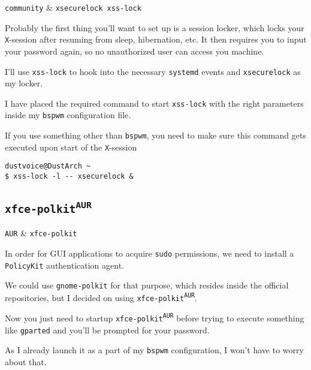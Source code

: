 \documentclass[10pt]{dustdoc}
\begin{document}
\begin{packagetable}
    \texttt{community} & \texttt{xsecurelock xss-lock} \\ 
\end{packagetable}

Probably the first thing you’ll want to set up is a session locker, which locks your \texttt{X}-session after resuming from sleep, hibernation, etc.
It then requires you to input your password again, so no unauthorized user can access you machine.

I’ll use \texttt{xss-lock} to hook into the necessary \texttt{systemd} events and \texttt{xsecurelock} as my locker.

\begin{NOTE}
    I have placed the required command to start \texttt{xss-lock} with the right parameters inside my \texttt{bspwm} configuration file.

    If you use something other than \texttt{bspwm}, you need to make sure this command gets executed upon start of the \texttt{X}-session

    \begin{verbatim}
dustvoice@DustArch ~
$ xss-lock -l -- xsecurelock &
    \end{verbatim}
\end{NOTE}

\subsection{\texttt{xfce-polkit\texorpdfstring{\textsuperscript{AUR}}{ (AUR)}}}
\label{sec:xfce-polkit-aur}

\begin{packagetable}
    \texttt{AUR} & \texttt{xfce-polkit} \\ 
\end{packagetable}

In order for GUI applications to acquire \texttt{sudo} permissions, we need to install a \texttt{PolicyKit} authentication agent.

We could use \texttt{gnome-polkit} for that purpose, which resides inside the official repositories, but I decided on using \texttt{xfce-polkit\textsuperscript{\texttt{AUR}}}.

Now you just need to startup \texttt{xfce-polkit\textsuperscript{\texttt{AUR}}} before trying to execute something like \texttt{gparted} and you’ll be prompted for your password.

As I already launch it as a part of my \texttt{bspwm} configuration, I won’t have to worry about that.
\end{document}
